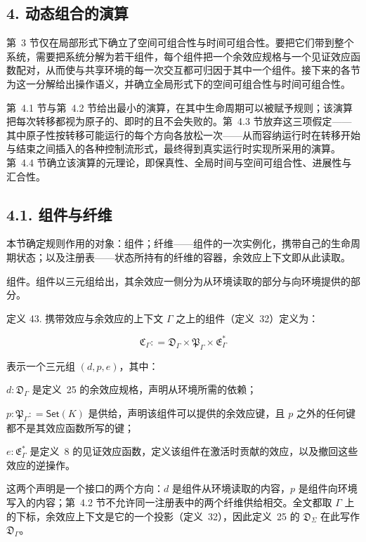 \subsection{4. 动态组合的演算}\label{a-calculus-of-dynamic-composition}

第~3 节仅在局部形式下确立了空间可组合性与时间可组合性。要把它们带到整个系统，需要把系统分解为若干组件，每个组件把一个余效应规格与一个见证效应函数配对，从而使与共享环境的每一次交互都可归因于其中一个组件。接下来的各节为这一分解给出操作语义，并确立全局形式下的空间可组合性与时间可组合性。

第~4.1 节与第~4.2 节给出最小的演算，在其中生命周期可以被赋予规则；该演算把每次转移都视为原子的、即时的且不会失败的。第~4.3 节放弃这三项假定——其中原子性按转移可能运行的每个方向各放松一次——从而容纳运行时在转移开始与结束之间插入的各种控制流形式，最终得到真实运行时实现所采用的演算。第~4.4 节确立该演算的元理论，即保真性、全局时间与空间可组合性、进展性与汇合性。

\subsection{4.1. 组件与纤维}\label{components-and-fibers}

本节确定规则作用的对象：组件；纤维——组件的一次实例化，携带自己的生命周期状态；以及注册表——状态所持有的纤维的容器，余效应上下文即从此读取。

组件。组件以三元组给出，其余效应一侧分为从环境读取的部分与向环境提供的部分。

定义 43. 携带效应与余效应的上下文 $\Gamma$ 之上的组件（定义~32）定义为：

\[
\mathfrak { C } _ { \Gamma } : = \mathfrak { D } _ { \Gamma } \times \mathfrak { P } _ { \Gamma } \times \mathfrak { E } _ { \Gamma } ^ { * }\tag{37}
\]

表示一个三元组 \(( d , p , e )\)，其中：

\(d : { \mathfrak { D } } _ { \Gamma }\) 是定义~25 的余效应规格，声明从环境所需的依赖；

\(p : \mathfrak { P } _ { \Gamma } : = \mathsf { S e t } ( K )\) 是供给，声明该组件可以提供的余效应键，且 $p$ 之外的任何键都不是其效应函数所写的键；

\(e : { \mathfrak { E } } _ { \Gamma } ^ { * }\) 是定义~8 的见证效应函数，定义该组件在激活时贡献的效应，以及撤回这些效应的逆操作。

这两个声明是一个接口的两个方向：$d$ 是组件从环境读取的内容，$p$ 是组件向环境写入的内容；第~4.2 节不允许同一注册表中的两个纤维供给相交。全文都取 $\Gamma$ 上的下标，余效应上下文是它的一个投影（定义~32），因此定义~25 的 \(\mathfrak { D } _ { \Sigma }\) 在此写作 \(\mathfrak { D } _ { \Gamma }\)。

